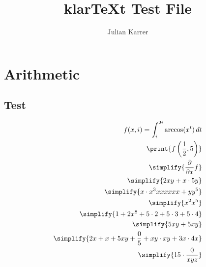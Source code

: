 \documentclass[oneside, a4paper]{article}
\author{Julian Karrer}
\title{klarTeXt Test File}
\begin{document}
\maketitle

\section*{Arithmetic}

\subsection*{Test}
\begin{program}
    \begin{align*}
        f(x,i) = \int_{i}^{2i} \arccos(x^t)\,dt \\
        \print{f\left(\frac{1}{2}, 5\right)}\\
        \simplify{\ddx{x} f}\\
        \simplify{2xy + x\cdot 5y}\\
        \simplify{x \cdot x^3 x x x x x x + y y^5}\\
        \simplify{x^2 x^5}\\
        \simplify{1 + 2x^8 + 5\cdot 2+ 5 \cdot 3 + 5 \cdot 4}\\
        \simplify{5xy + 5xy}\\
        \simplify{2x + x + 5xy + \frac{0}{5} + xy \cdot xy + 3x \cdot 4x}\\
        \simplify{15\cdot\frac{0}{xyz}}
    \end{align*}
\end{program}



\end{document}
